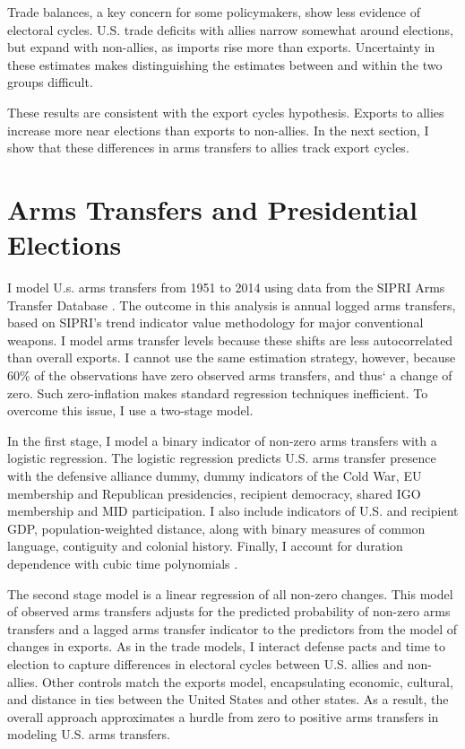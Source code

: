 \documentclass[12pt]{article}
\begin{document}
Trade balances, a key concern for some policymakers, show less evidence of electoral cycles. 
U.S. trade deficits with allies narrow somewhat around elections, but expand with non-allies, as imports rise more than exports. 
Uncertainty in these estimates makes distinguishing the estimates between and within the two groups difficult.


These results are consistent with the export cycles hypothesis. 
Exports to allies increase more near elections than exports to non-allies.
In the next section, I show that these differences in arms transfers to allies track export cycles.



\section{Arms Transfers and Presidential Elections}


I model U.s. arms transfers from 1951 to 2014 using data from the SIPRI Arms Transfer Database \citep{SIPRI2021}.
The outcome in this analysis is annual logged arms transfers, based on SIPRI's trend indicator value methodology for major conventional weapons.
I model arms transfer levels because these shifts are less autocorrelated than overall exports.
I cannot use the same estimation strategy, however, because 60\% of the observations have zero observed arms transfers, and thus` a change of zero.
Such zero-inflation makes standard regression techniques inefficient.
To overcome this issue, I use a two-stage model. 


In the first stage, I model a binary indicator of non-zero arms transfers with a logistic regression. 
The logistic regression predicts U.S. arms transfer presence with the defensive alliance dummy, dummy indicators of the Cold War, EU membership and Republican presidencies, recipient democracy, shared IGO membership and MID participation. 
I also include indicators of U.S. and recipient GDP, population-weighted distance, along with binary measures of common language, contiguity and colonial history. 
Finally, I account for duration dependence with cubic time polynomials \citep{CarterSignorino2010}.


The second stage model is a linear regression of all non-zero changes.
This model of observed arms transfers adjusts for the predicted probability of non-zero arms transfers and a lagged arms transfer indicator to the predictors from the model of changes in exports.
As in the trade models, I interact defense pacts and time to election to capture differences in electoral cycles between U.S. allies and non-allies. 
Other controls match the exports model, encapsulating economic, cultural, and distance in ties between the United States and other states. 
As a result, the overall approach approximates a hurdle from zero to positive arms transfers in modeling U.S. arms transfers.
\end{document}
